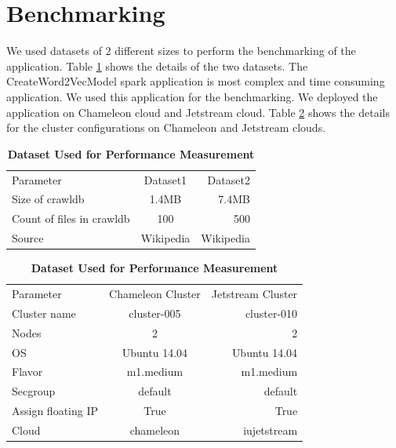 \section{Benchmarking} \label{benchmarking}
We used datasets of 2 different sizes to perform the benchmarking of the
application. Table \ref{tab:datasets} shows the details of the two datasets.
The CreateWord2VecModel spark application is most complex and time
consuming application. We used this application for the benchmarking. We
deployed the application on Chameleon cloud and Jetstream cloud. Table
\ref{tab:cloudconfig} shows the details for the cluster configurations on
Chameleon and Jetstream clouds.

\begin{table}[htbp]
\centering
\caption{\bf Dataset Used for Performance Measurement}
  \begin{tabular}{l|c|r}
    \hline
    Parameter & Dataset1 & Dataset2 \\
    Size of crawldb & 1.4MB & 7.4MB \\
    Count of files in crawldb & 100 & 500 \\
    Source & Wikipedia & Wikipedia \\
    \hline
  \end{tabular}
  \label{tab:datasets}
\end{table}


\begin{table}[htbp]
\centering
\caption{\bf Dataset Used for Performance Measurement}
  \begin{tabular}{ l | c | r }
    \hline
    Parameter & Chameleon Cluster & Jetstream Cluster \\
    Cluster name & cluster-005 & cluster-010 \\
    Nodes & 2 & 2 \\
    OS & Ubuntu 14.04 & Ubuntu 14.04 \\
    Flavor & m1.medium & m1.medium \\
    Secgroup & default & default \\
    Assign floating IP & True & True \\
    Cloud & chameleon & iujetstream \\
    \hline
  \end{tabular}
  \label{tab:cloudconfig}
\end{table}


